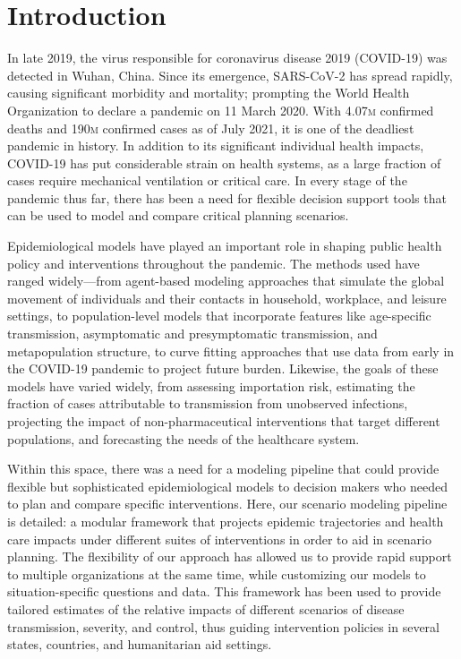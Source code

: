 \section{Introduction}

In late 2019, the virus responsible for coronavirus disease 2019 (COVID-19) was detected in Wuhan, China\cite{Zhu:NovelCoronavirusPatients:2020}. Since its emergence, SARS-CoV-2 has spread rapidly, causing significant morbidity and mortality; prompting the World Health Organization to declare a pandemic on 11 March 2020\cite{WHO:WHODirectorGeneralOpening:2020}. With 4.07\textsc{m} confirmed deaths and 190\textsc{m} confirmed cases as of July 2021, it is one of the deadliest pandemic in history. In addition to its significant individual health impacts, COVID-19 has put considerable strain on health systems, as a large fraction of cases require mechanical ventilation or critical care\cite{Huang:ClinicalFeaturesPatients:2020}. In every stage of the pandemic thus far, there has been a need for flexible decision support tools that can be used to model and compare critical planning scenarios. 

Epidemiological models have played an important role in shaping public health policy and interventions throughout the pandemic. The methods used have ranged widely—from agent-based modeling approaches that simulate the global movement of individuals and their contacts in household, workplace, and leisure settings\cite{Ferguson:ReportImpactNonpharmaceutical:2020}, to population-level models that incorporate features like age-specific transmission, asymptomatic and presymptomatic transmission, and metapopulation structure\cite{Chinazzi:EffectTravelRestrictions:2020,Branas:FlatteningCurveIt:2020,Moghadas:ProjectingHospitalUtilization:2020,Davies:AgedependentEffectsTransmission:2020}, to curve fitting approaches that use data from early in the COVID-19 pandemic to project future burden\cite{IHME:ForecastingImpactFirst:2020}. Likewise, the goals of these models have varied widely, from assessing importation risk, estimating the fraction of cases attributable to transmission from unobserved infections, projecting the impact of non-pharmaceutical interventions that target different populations, and forecasting the needs of the healthcare system. 

Within this space, there was a need for a modeling pipeline that could provide flexible but sophisticated epidemiological models to decision makers who needed to plan and compare specific interventions. Here, our scenario modeling pipeline is detailed: a modular framework that projects epidemic trajectories and health care impacts under different suites of interventions in order to aid in scenario planning. The flexibility of our approach has allowed us to provide rapid support to multiple organizations at the same time, while customizing our models to situation-specific questions and data. This framework has been used to provide tailored estimates of the relative impacts of different scenarios of disease transmission, severity, and control, thus guiding intervention policies in several states, countries, and humanitarian aid settings.

